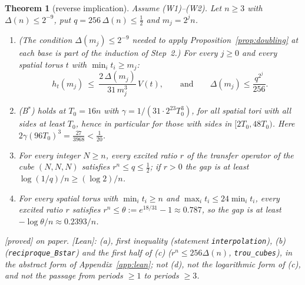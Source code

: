 \documentclass[11pt,a4paper]{article}
\theoremstyle{plain}
\newtheorem{theorem}{Theorem}[section]
\theoremstyle{definition}
\theoremstyle{remark}
\numberwithin{equation}{section}
\newcommand{\st}[1]{\textsf{[#1]}}
\begin{document}
\begin{theorem}[reverse implication]\label{thm:R}
Assume (W1)--(W2). Let $n\ge3$ with $\Delta(n)\le2^{-9}$, put $q=256\,\Delta(n)\le\frac12$ and $m_j=2^jn$.
\begin{enumerate}
\item[(a)] (The condition $\Delta(m_j)\le2^{-9}$ needed to apply Proposition~\ref{prop:doubling} at each base is part of the induction of Step~2.) For every $j\ge0$ and every spatial torus $t$ with $\min_it_i\ge m_j$:
\[
h_t(m_j)\ \le\ \frac{2\,\Delta(m_j)}{31\,m_j^3}\,V(t),\qquad\text{and}\qquad \Delta(m_j)\le\frac{q^{2^j}}{256}.
\]
\item[(b)] (B$^*$) holds at $T_0=16n$ with $\gamma=1/(31\cdot2^{23}T_0^3)$, for all spatial tori with all sides at least $T_0$, hence in particular for those with sides in $[2T_0,48T_0)$. Here
$2\gamma(96T_0)^3=\frac{27}{3968}<\frac1{20}$.
\item[(c)] For every integer $N\ge n$, every excited ratio $r$ of the transfer operator of the cube $(N,N,N)$ satisfies $r^n\le q\le\frac12$; if $r>0$ the gap is at least
$\log(1/q)/n\ge(\log2)/n$.
\item[(d)] For every spatial torus with $\min_it_i\ge n$ and $\max_it_i\le24\min_it_i$, every excited ratio $r$ satisfies $r^n\le\theta:=e^{18/31}-1\approx0.787$, so the gap is at least $-\log\theta/n\approx0.2393/n$.
\end{enumerate}
\st{proved} on paper. \st{Lean}: (a), first inequality (statement \texttt{interpolation}), (b) (\texttt{reciproque\_Bstar}) and the first half of (c) ($r^n\le256\Delta(n)$, \texttt{trou\_cubes}), in the abstract form of Appendix~\ref{app:lean}; not (d), not the logarithmic form of (c), and not the passage from periods $\ge1$ to periods $\ge3$.
\end{theorem}
\end{document}
